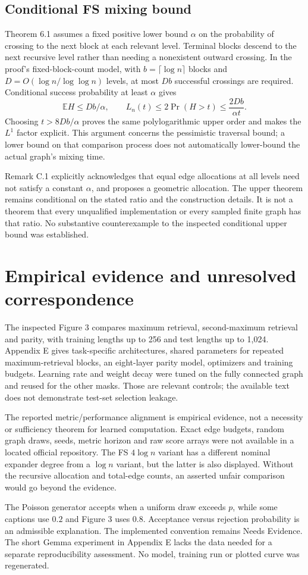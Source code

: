 \documentclass[10pt]{article}
\begin{document}
\subsection*{Conditional FS mixing bound}
Theorem 6.1 assumes a fixed positive lower bound \(\alpha\) on the probability of crossing to the next block at each relevant level. Terminal blocks descend to the next recursive level rather than needing a nonexistent outward crossing. In the proof’s fixed-block-count model, with \(b=\lceil\log n\rceil\) blocks and \(D=O(\log n/\log\log n)\) levels, at most \(Db\) successful crossings are required. Conditional success probability at least \(\alpha\) gives \[\mathbb E H\le Db/\alpha,\qquad
L_n(t)\le2\Pr(H>t)\le \frac{2Db}{\alpha t}.\] Choosing \(t>8Db/\alpha\) proves the same polylogarithmic upper order and makes the \(L^1\) factor explicit. This argument concerns the pessimistic traversal bound; a lower bound on that comparison process does not automatically lower-bound the actual graph’s mixing time.\par
Remark C.1 explicitly acknowledges that equal edge allocations at all levels need not satisfy a constant \(\alpha\), and proposes a geometric allocation. The upper theorem remains conditional on the stated ratio and the construction details. It is not a theorem that every unqualified implementation or every sampled finite graph has that ratio. No substantive counterexample to the inspected conditional upper bound was established.\par
\section*{Empirical evidence and unresolved correspondence}
The inspected Figure 3 compares maximum retrieval, second-maximum retrieval and parity, with training lengths up to 256 and test lengths up to 1,024. Appendix E gives task-specific architectures, shared parameters for repeated maximum-retrieval blocks, an eight-layer parity model, optimizers and training budgets. Learning rate and weight decay were tuned on the fully connected graph and reused for the other masks. Those are relevant controls; the available text does not demonstrate test-set selection leakage.\par
The reported metric/performance alignment is empirical evidence, not a necessity or sufficiency theorem for learned computation. Exact edge budgets, random graph draws, seeds, metric horizon and raw score arrays were not available in a located official repository. The FS \(4\log n\) variant has a different nominal expander degree from a \(\log n\) variant, but the latter is also displayed. Without the recursive allocation and total-edge counts, an asserted unfair comparison would go beyond the evidence.\par
The Poisson generator accepts when a uniform draw exceeds \(p\), while some captions use \(0.2\) and Figure 3 uses \(0.8\). Acceptance versus rejection probability is an admissible explanation. The implemented convention remains Needs Evidence. The short Gemma experiment in Appendix E lacks the data needed for a separate reproducibility assessment. No model, training run or plotted curve was regenerated.\par
\end{document}
